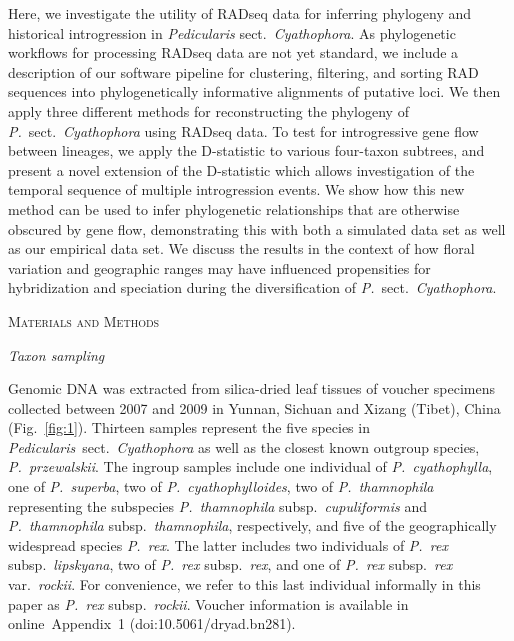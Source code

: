 \documentclass[12pt,letterpaper]{article}
\renewcommand{\section}[1]{%
\bigskip
\begin{center}
\begin{Large}
\normalfont\scshape #1
\medskip
\end{Large}
\end{center}}
\renewcommand{\subsection}[1]{%
\bigskip
\begin{center}
\begin{large}
\normalfont\itshape #1
\end{large}
\end{center}}
\begin{document}
Here, we investigate the utility of RADseq data for inferring
phylogeny and historical introgression in \emph{Pedicularis} sect.\
\emph{Cyathophora}. As phylogenetic workflows for processing RADseq
data are not yet standard, we include a description of our software
pipeline for clustering, filtering, and sorting RAD sequences into
phylogenetically informative alignments of putative loci. We then
apply three different methods for reconstructing the phylogeny of
\emph{P.}\ sect.\ \emph{Cyathophora} using RADseq data. To test for
introgressive gene flow between lineages, we apply the D-statistic to
various four-taxon subtrees, and present a novel extension of the
D-statistic which allows investigation of the temporal sequence of
multiple introgression events. We show how this new method can be used
to infer phylogenetic relationships that are otherwise obscured by
gene flow, demonstrating this with both a simulated data set as well
as our empirical data set. We discuss the results in the context of
how floral variation and geographic ranges may have influenced
propensities for hybridization and speciation during the
diversification of \emph{P.}\ sect.\ \emph{Cyathophora}.

\section{Materials and Methods}

\subsection{Taxon sampling}
Genomic DNA was extracted from silica-dried leaf tissues of voucher
specimens collected between 2007 and 2009 in Yunnan, Sichuan and
Xizang (Tibet), China (Fig.~\ref{fig:1}). Thirteen samples represent
the five species in \emph{Pedicularis}\ sect.\ \emph{Cyathophora} as
well as the closest known outgroup species, \emph{P.~przewalskii}.
The ingroup samples include one individual of \emph{P.~cyathophylla},
one of \emph{P.~superba}, two of \emph{P.~cyathophylloides}, two of
\emph{P.~thamnophila} representing the subspecies
\emph{P.~thamnophila} subsp.\ \emph{cupuliformis} 
and \emph{P.~thamnophila} subsp.\ \emph{thamnophila}, respectively,
and five of the geographically widespread species \emph{P.~rex}. The
latter includes two individuals of \emph{P.~rex} subsp.\
\emph{lipskyana}, two of \emph{P.~rex} subsp.\ \emph{rex}, and one of
\emph{P.~rex} subsp.\ \emph{rex} var.\ \emph{rockii}. For convenience,
we refer to this last individual informally in this paper as
\emph{P.~rex} subsp.\ \emph{rockii}. 
Voucher information is available in online~Appendix~1 (doi:10.5061/dryad.bn281). %
\end{document}
